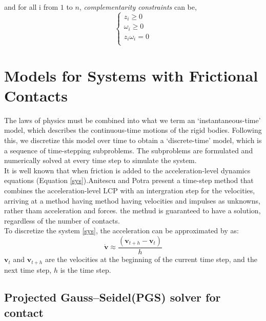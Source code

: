             and for all i from $1$ to $n$, \textit{complementarity constraints} can be,
            \begin{equation}
                \begin{cases}
                    z_i \ge 0 \\
                    \omega_i \ge 0 \\
                    z_i \omega_i = 0 \\
                \end{cases}
            \end{equation}


\section{Models for Systems with Frictional Contacts}

        The laws of physics must be combined into what we term an `instantaneous-time' model, which describes the continuous-time motions of the rigid bodies. Following this, we discretize this model over time to obtain a ‘discrete-time’ model, which is a sequence of time-stepping subproblems. The subproblems are formulated and numerically solved at every time step to simulate the system. \\

        It is well known that when friction is added to the acceleration-level dynamics equations (Equation \ref{sys}).Anitescu and Potra \cite{anitescu1997modeling} present a time-step method that combines the acceleration-level LCP with an intergration step for the velocities, arriving at a method having method having velocities and impulses as unknowns, rather tham acceleration and forces. the methud is guaranteed to have a solution, regardless of the number of contacts. \\

        To discretize the system \ref{sys}, the acceleration can be approximated by \cite{anitescu1997modeling} as:
            \begin{equation}
                \dot{\mathbf{v}} \approx \frac{(\mathbf{v}_{t+h} - \mathbf{v}_t)}{h}
            \end{equation}
        $\mathbf{v}_t$ and $\mathbf{v}_{t+h}$ are the velocities at the beginning of the current time step, and the next time step, $h$ is the time step.



    \subsection{Projected Gauss–Seidel(PGS) solver for contact}

      